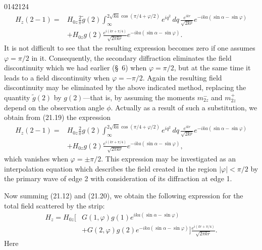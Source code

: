 \begin{scanpage}{0142}{124}
\[
\begin{aligned}H_z(2-1)={}&H_{0z}\frac2\pi\widetilde g(2)\int_\infty^{2\sqrt{ka}\cos(\pi/4+\varphi/2)}e^{iq^2}\,dq\,\frac{e^{ikr}}{\sqrt{2kr}}e^{-ika(\sin\alpha-\sin\varphi)}\\
&+H_{0z}g(2)\frac{e^{i(kr+\pi/4)}}{\sqrt{2\pi kr}}e^{-ika(\sin\alpha-\sin\varphi)}.
\end{aligned}\tag{21.19}
\]
It is not difficult to see that the resulting expression becomes zero if one assumes $\varphi=\pi/2$ in it. Consequently, the secondary diffraction eliminates the field discontinuity which we had earlier (\S~6) when $\varphi=\pi/2$, but at the same time it leads to a field discontinuity when $\varphi=-\pi/2$. Again the resulting field discontinuity may be eliminated by the above indicated method, replacing the quantity $\widetilde g(2)$ by $g(2)$---that is, by assuming the moments $m_{2z}^-$ and $m_{2z}^+$ depend on the observation angle $\phi$. Actually as a result of such a substitution, we obtain from (21.19) the expression
\[
\begin{aligned}H_z(2-1)={}&H_{0z}\frac2\pi g(2)\int_\infty^{2\sqrt{ka}\cos(\pi/4+\varphi/2)}e^{iq^2}\,dq\,\frac{e^{ikr}}{\sqrt{2kr}}e^{-ika(\sin\alpha-\sin\varphi)}\\
&+H_{0z}g(2)\frac{e^{i(kr+\pi/4)}}{\sqrt{2\pi kr}}e^{-ika(\sin\alpha-\sin\varphi)},
\end{aligned}\tag{21.20}
\]
which vanishes when $\varphi=\pm\pi/2$. This expression may be investigated as an interpolation equation which describes the field created in the region $|\varphi|<\pi/2$ by the primary wave of edge 2 with consideration of its diffraction at edge 1.

Now summing (21.12) and (21.20), we obtain the following expression for the total field scattered by the strip:
\[
\begin{aligned}H_z=H_{0z}\bigl[&G(1,\varphi)g(1)e^{ika(\sin\alpha-\sin\varphi)}\\
&+G(2,\varphi)g(2)e^{-ika(\sin\alpha-\sin\varphi)}\bigr]\frac{e^{i(kr+\pi/4)}}{\sqrt{2\pi kr}}.
\end{aligned}\tag{21.21}
\]
Here
\end{scanpage}
